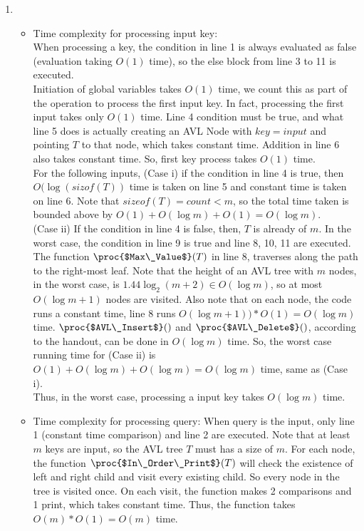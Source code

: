 \documentclass[11pt, answers]{exam}
\theoremstyle{plain}
\theoremstyle{definition}
\begin{document}
\begin{questions}
\begin{solution}
\begin{enumerate}
\item 
\begin{itemize}
\item Time complexity for processing input key:\\
When processing a key, the condition in line 1 is always evaluated as false (evaluation taking $O(1)$ time), so the else block from line 3 to 11 is executed.\\
Initiation of global variables takes $O(1)$ time, we count this as part of the operation to process the first input key.
In fact, processing the first input takes only $O(1)$ time. Line 4 condition must be true, and what line 5 does is actually creating an AVL Node with $key=input$ and pointing $T$ to that node, which takes constant time. Addition in line 6 also takes constant time. So, first key process takes $O(1)$ time.\\
For the following inputs, (Case i) if the condition in line 4 is true, then $O(\log{(sizof(T))}$ time is taken on line 5 and constant time is taken on line 6. Note that $sizeof(T) =count< m$, so the total time taken is bounded above by $O(1)+O(\log{m})+O(1)=O(\log{m})$. \\
(Case ii) If the condition in line 4 is false, then, $T$ is already of $m$. In the worst case, the condition in line 9 is true and line 8, 10, 11 are executed. The function $\proc{$Max\_Value$}(T)$ in line 8, traverses along the path to the right-most leaf. 
Note that the height of an AVL tree with $m$ nodes, in the worst case, is $1.44\log_2{(m+2)}\in O(\log{m})$, so at most $O(\log{m}+1)$ nodes are visited. Also note that on each node, the code runs a constant time, line 8 runs $O(\log{m}+1))*O(1) = O(\log{m})$ time.
$\proc{$AVL\_Insert$}()$ and $\proc{$AVL\_Delete$}()$, according to the handout, can be done in $O(\log{m})$ time. So, the worst case running time for (Case ii) is $O(1)+O(\log{m})+O(\log{m}) = O(\log{m})$ time, same as (Case i).\\
Thus, in the worst case, processing a input key takes $O(\log{m})$ time.

\item Time complexity for processing query:
When query is the input, only line 1 (constant time comparison) and line 2 are executed. Note that at least $m$ keys are input, so the AVL tree $T$ must has a size of $m$. For each node, the function $\proc{$In\_Order\_Print$}(T)$ will check the existence of left and right child and visit every existing child. So every node in the tree is visited once. On each visit, the function makes 2 comparisons and 1 print, which takes constant time. Thus, the function takes $O(m) * O(1)=O(m)$ time.
\end{itemize}
\end{enumerate}

\end{solution}

\end{questions}
\end{document}
